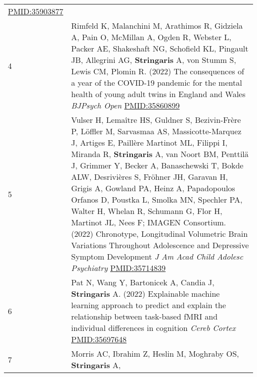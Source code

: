\documentclass[
]{article}
\begin{document}
\begin{longtable}[]{@{}ll@{}}
\begin{minipage}[t]{0.94\columnwidth}
\url{PMID:35903877}\strut
\end{minipage}\tabularnewline
\begin{minipage}[t]{0.01\columnwidth}\raggedright
4\strut
\end{minipage} & \begin{minipage}[t]{0.94\columnwidth}\raggedright
Rimfeld K, Malanchini M, Arathimos R, Gidziela A, Pain O, McMillan A,
Ogden R, Webster L, Packer AE, Shakeshaft NG, Schofield KL, Pingault JB,
Allegrini AG, \textbf{Stringaris} A, von Stumm S, Lewis CM, Plomin R.
(2022) The consequences of a year of the COVID-19 pandemic for the
mental health of young adult twins in England and Wales \emph{BJPsych
Open} \url{PMID:35860899}\strut
\end{minipage}\tabularnewline
\begin{minipage}[t]{0.01\columnwidth}\raggedright
5\strut
\end{minipage} & \begin{minipage}[t]{0.94\columnwidth}\raggedright
Vulser H, Lemaître HS, Guldner S, Bezivin-Frère P, Löffler M, Sarvasmaa
AS, Massicotte-Marquez J, Artiges E, Paillère Martinot ML, Filippi I,
Miranda R, \textbf{Stringaris} A, van Noort BM, Penttilä J, Grimmer Y,
Becker A, Banaschewski T, Bokde ALW, Desrivières S, Fröhner JH, Garavan
H, Grigis A, Gowland PA, Heinz A, Papadopoulos Orfanos D, Poustka L,
Smolka MN, Spechler PA, Walter H, Whelan R, Schumann G, Flor H, Martinot
JL, Nees F; IMAGEN Consortium. (2022) Chronotype, Longitudinal
Volumetric Brain Variations Throughout Adolescence and Depressive
Symptom Development \emph{J Am Acad Child Adolesc Psychiatry}
\url{PMID:35714839}\strut
\end{minipage}\tabularnewline
\begin{minipage}[t]{0.01\columnwidth}\raggedright
6\strut
\end{minipage} & \begin{minipage}[t]{0.94\columnwidth}\raggedright
Pat N, Wang Y, Bartonicek A, Candia J, \textbf{Stringaris} A. (2022)
Explainable machine learning approach to predict and explain the
relationship between task-based fMRI and individual differences in
cognition \emph{Cereb Cortex} \url{PMID:35697648}\strut
\end{minipage}\tabularnewline
\begin{minipage}[t]{0.01\columnwidth}\raggedright
7\strut
\end{minipage} & \begin{minipage}[t]{0.94\columnwidth}\raggedright
Morris AC, Ibrahim Z, Heslin M, Moghraby OS, \textbf{Stringaris} A,

\end{minipage}
\end{longtable}
\end{document}
